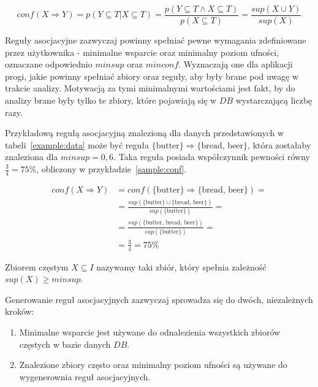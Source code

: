 \begin{equation}\label{confidence:def2}
	conf(X \Rightarrow Y) = p(Y \subseteq T | X\subseteq T) = \frac{p(Y \subseteq T \land X\subseteq T)}{p(X\subseteq T)} =\frac{sup(X \cup Y)}{sup(X)}
\end{equation}

Reguły asocjacyjne zazwyczaj powinny spełniać pewne wymagania zdefiniowane przez użytkownika - minimalne wsparcie oraz minimalny poziom ufności, oznaczane odpowiednio $minsup$ oraz $minconf$. Wyznaczają one dla aplikacji progi, jakie powinny spełniać zbiory oraz reguły, aby były brane pod uwagę w trakcie analizy. Motywacją za tymi minimalnymi wartościami jest fakt, by do analizy brane były tylko te zbiory, które pojawiają się w $DB$ wystarczającą liczbę razy.

Przykładową regułą asocjacyjną znalezioną dla danych przedstawionych w tabeli~\ref{example:data} może być reguła $\lbrace \textrm{butter} \rbrace \Rightarrow \lbrace \textrm{bread, beer} \rbrace$, która zostałaby znaleziona dla $minsup = 0,6$. Taka reguła posiada współczynnik pewności równy $\frac{3}{4}=75\%$, obliczony w przykładzie~\ref{sample:conf}.

\begin{equation}\label{sample:conf}
\begin{split}
conf(X \Rightarrow Y)& = conf(\lbrace \textrm{butter} \rbrace \Rightarrow \lbrace \textrm{bread, beer} \rbrace) =\\
& = \frac{sup(\lbrace \textrm{butter} \rbrace \cup \lbrace \textrm{bread, beer} \rbrace)}{sup(\lbrace \textrm{butter} \rbrace)} =\\
& = \frac{sup(\lbrace \textrm{butter, bread, beer} \rbrace)}{sup(\lbrace \textrm{butter} \rbrace)} =\\
& = \frac{3}{4} = 75\%
\end{split}
\end{equation}

\begin{df}
Zbiorem częstym $X \subseteq I$ nazywamy taki zbiór, który spełnia zależność $sup(X) \geq minsup$.
\end{df}

Generowanie reguł asocjacyjnych zazwyczaj sprowadza się do dwóch, niezależnych kroków:
\begin{enumerate}
	\item Minimalne wsparcie jest używane do odnalezienia wszystkich zbiorów częstych w bazie danych $DB$.
	\item Znalezione zbiory często oraz minimalny poziom ufności są używane do wygenerownia reguł asocjacyjnych.
\end{enumerate}

